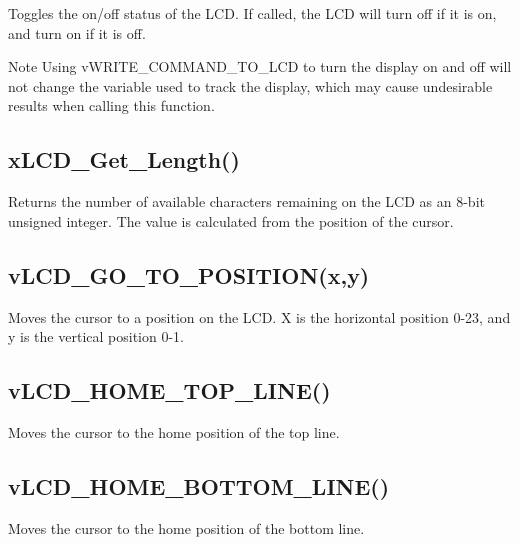 Toggles the on/off status of the L\-C\-D. If called, the L\-C\-D will turn off if it is on, and turn on if it is off. \begin{DoxyNote}{Note}
Using v\-W\-R\-I\-T\-E\-\_\-\-C\-O\-M\-M\-A\-N\-D\-\_\-\-T\-O\-\_\-\-L\-C\-D to turn the display on and off will not change the variable used to track the display, which may cause undesirable results when calling this function.
\end{DoxyNote}
\hypertarget{_usage_length}{}\subsection{x\-L\-C\-D\-\_\-\-Get\-\_\-\-Length()}\label{_usage_length}
Returns the number of available characters remaining on the L\-C\-D as an 8-\/bit unsigned integer. The value is calculated from the position of the cursor.\hypertarget{_usage_goto}{}\subsection{v\-L\-C\-D\-\_\-\-G\-O\-\_\-\-T\-O\-\_\-\-P\-O\-S\-I\-T\-I\-O\-N(x,y)}\label{_usage_goto}
Moves the cursor to a position on the L\-C\-D. X is the horizontal position 0-\/23, and y is the vertical position 0-\/1.\hypertarget{_test_plans_tophome}{}\subsection{v\-L\-C\-D\-\_\-\-H\-O\-M\-E\-\_\-\-T\-O\-P\-\_\-\-L\-I\-N\-E()}\label{_test_plans_tophome}
Moves the cursor to the home position of the top line.\hypertarget{_test_plans_bottomhome}{}\subsection{v\-L\-C\-D\-\_\-\-H\-O\-M\-E\-\_\-\-B\-O\-T\-T\-O\-M\-\_\-\-L\-I\-N\-E()}\label{_test_plans_bottomhome}
Moves the cursor to the home position of the bottom line. 
